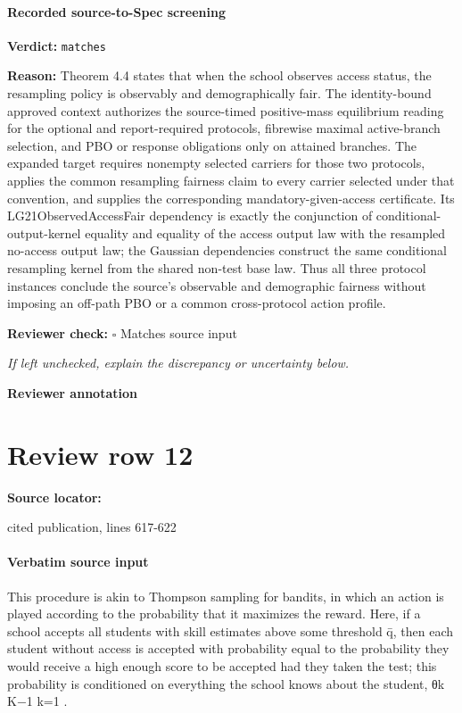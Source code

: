 \documentclass[10pt]{article}
\newcommand{\reviewerbox}{%
  \par\noindent\fbox{\parbox{0.96\linewidth}{\rule{0pt}{0.38in}}}\par
}
\newcommand{\reviewmatch}[1]{%
  \par\noindent\textbf{Reviewer check:} $\square$\; #1\par
  \noindent\emph{If left unchecked, explain the discrepancy or uncertainty below.}\par
}
\begin{document}
\paragraph{Recorded source-to-Spec screening}
\textbf{Verdict:} \texttt{matches}
\\
{\raggedright
\textbf{Reason:} Theorem 4.\allowbreak{}4 states that when the school observes access status, the resampling policy is observably and demographically fair.\allowbreak{} The identity-\allowbreak{}bound approved context authorizes the source-\allowbreak{}timed positive-\allowbreak{}mass equilibrium reading for the optional and report-\allowbreak{}required protocols, fibrewise maximal active-\allowbreak{}branch selection, and PBO or response obligations only on attained branches.\allowbreak{} The expanded target requires nonempty selected carriers for those two protocols, applies the common resampling fairness claim to every carrier selected under that convention, and supplies the corresponding mandatory-\allowbreak{}given-\allowbreak{}access certificate.\allowbreak{} Its LG21ObservedAccessFair dependency is exactly the conjunction of conditional-\allowbreak{}output-\allowbreak{}kernel equality and equality of the access output law with the resampled no-\allowbreak{}access output law;\allowbreak{} the Gaussian dependencies construct the same conditional resampling kernel from the shared non-\allowbreak{}test base law.\allowbreak{} Thus all three protocol instances conclude the source's observable and demographic fairness without imposing an off-\allowbreak{}path PBO or a common cross-\allowbreak{}protocol action profile.\allowbreak{}
\par}
\reviewmatch{Matches source input}
\noindent\textbf{Reviewer annotation}\par
\reviewerbox
\clearpage
\hypertarget{source-claim-04dd258ca7c3223a}{}
\section*{Review row 12}
\textbf{Source locator:} {\footnotesize\raggedright cited publication, lines 617-\allowbreak{}622\par}
\paragraph{Verbatim source input}
\begin{ReviewVerbatim}
This procedure is akin to Thompson sampling for bandits, in which an action is played according
to the probability that it maximizes the reward. Here, if a school accepts all students with skill
estimates above some threshold q̄, then each student without access is accepted with probability
equal to the probability they would receive a high enough score to be accepted had they taken the
test; this probability is conditioned on everything the school knows about the student, {θk }K−1
k=1 .
\end{ReviewVerbatim}
\end{document}
